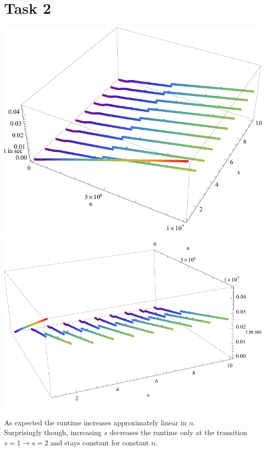 \documentclass[10pt,a4paper]{article}
\begin{document}
\section{Task 2}
\includegraphics[scale=0.5]{graph1.pdf}
\includegraphics[scale=0.5]{graph2.pdf}

As expected the runtime increases approximately linear in $n$.\\
Surprisingly though, increasing $s$ decreases the runtime only at the transition $s=1 \rightarrow s=2$ and stays constant for constant $n$.
\end{document}

